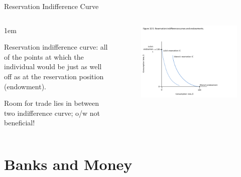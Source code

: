 \documentclass[11pt,aspectratio=43,usenames,dvipsnames]{beamer}
\let\olditemize=\itemize
\let\endolditemize=\enditemize
\renewenvironment{itemize}{\olditemize \itemsep1em}{\endolditemize}
\theoremstyle{definition}
\begin{document}
\begin{frame}{Reservation Indifference Curve}
\label{slide:Reservation_Indifference_Curve}
    \begin{columns}
        \begin{column}{0.4\textwidth}
            \begin{itemize}
                \item Reservation indifference curve: all of the points at which the individual would be just as well off as at the reservation position (endowment).
                \item \alert{Room for trade} lies in \alert{between} two indifference curve; o/w not beneficial!
            \end{itemize}
        \end{column}
        \begin{column}{0.6\textwidth}
            \begin{figure}
                \centering
                \includegraphics[trim={1.5cm 1.5cm 1.5cm 1.5cm}, clip, width=\textwidth]{./figures/Figure7.pdf}
            \end{figure}

        \end{column}
    \end{columns}

\end{frame}

\section[\faBank \& \faMoney]{Banks and Money}
\label{sec:Banks_and_Money}
\end{document}
